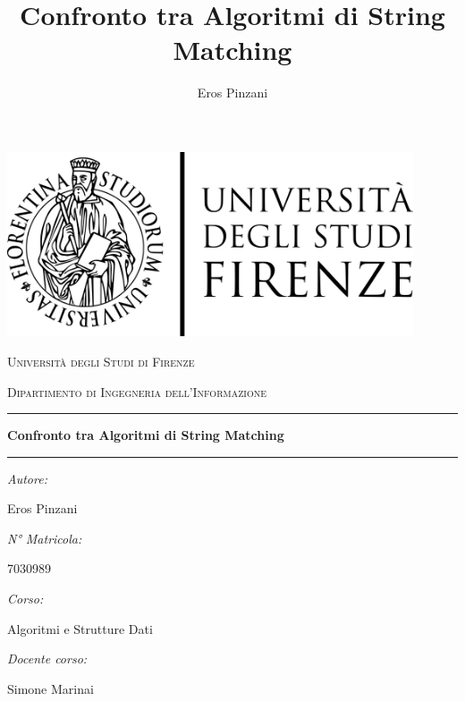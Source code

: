 \documentclass{article}
\title{Confronto tra Algoritmi di String Matching}
\author{Eros Pinzani}
\begin{document}
\begin{titlepage}
    \centering
    \includegraphics[width=0.90\textwidth]{img/Logo_universita_firenze.svg.png}\par\vspace{1cm}
    {\scshape\LARGE Università degli Studi di Firenze \par}
    \vspace{0.25cm}
    {\scshape\Large Dipartimento di Ingegneria dell'Informazione\par}
    \vspace{0.5cm}
    \rule{\linewidth}{0.4pt}
    \begin{center}
        {\Huge{\bfseries \textbf{Confronto tra Algoritmi di String Matching}\par}}
    \end{center}
    \rule{\linewidth}{0.4pt}
    \vspace{1cm}

    \begin{minipage}[t]{0.4\textwidth}
        \begin{flushleft} \large
            \emph{Autore:}\par
            Eros Pinzani\par
        \end{flushleft}

        \begin{flushleft} \large
            \emph{N° Matricola:}\par
            7030989\par
        \end{flushleft}
    \end{minipage}
    \hfill
    \begin{minipage}[t]{0.4\textwidth}
        \begin{flushleft} \large\raggedleft
            \emph{Corso:}\par
            Algoritmi e Strutture Dati
        \end{flushleft}

        \begin{flushleft} \large\raggedleft
            \emph{Docente corso:}\par
            Simone Marinai\par
        \end{flushleft}
    \end{minipage}

\end{titlepage}
\end{document}
